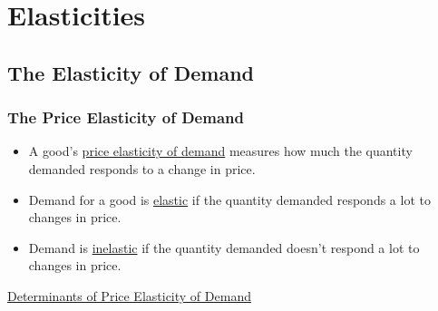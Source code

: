 \chapter{Elasticities}

\section{The Elasticity of Demand}

\subsection{The Price Elasticity of Demand}

\begin{itemize}

	\item A good's \underline{price elasticity of demand} measures how much the quantity demanded responds to a change in price.
	
	\item Demand for a good is \underline{elastic} if the quantity demanded responds a lot to changes in price.
	
	\item Demand is \underline{inelastic} if the quantity demanded doesn't respond a lot to changes in price. 

\end{itemize}

\underline{Determinants of Price Elasticity of Demand}

